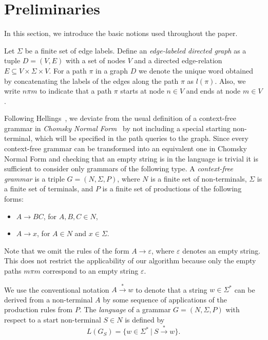 \documentclass[runningheads,a4paper]{llncs}
\begin{document}
\section{Preliminaries} \label{section_preliminaries}%
In this section, we introduce the basic notions used throughout the paper.

Let $\Sigma$ be a finite set of edge labels. Define an \textit{edge-labeled directed graph} as a tuple $D = (V, E)$ with a set of nodes $V$ and a directed edge-relation $E \subseteq V \times \Sigma \times V$.  For a path $\pi$ in a graph $D$ we denote the unique word obtained by concatenating the labels of the edges along the path $\pi$ as $l(\pi)$. Also, we write $n \pi m$ to indicate that a path $\pi$ starts at node $n \in V$ and ends at node $m \in V$.

Following Hellings~\cite{hellingsRelational}, we deviate from the usual definition of a context-free grammar in \textit{Chomsky Normal Form}~\cite{chomsky} by not including a special starting non-terminal, which will be specified in the path queries to the graph. Since every context-free grammar can be transformed into an equivalent one in Chomsky Normal Form and checking that an empty string is in the language is trivial it is sufficient to consider only grammars of the following type. A \textit{context-free grammar} is a triple $G = (N, \Sigma, P)$, where $N$ is a finite set of non-terminals, $\Sigma$ is a finite set of terminals, and $P$ is a finite set of productions of the following forms:

\begin{itemize}
	\item $A \rightarrow B C$, for $A,B,C \in N$,
	\item $A \rightarrow x$, for $A \in N$ and $x \in \Sigma$.   
\end{itemize}

Note that we omit the rules of the form $A \rightarrow \varepsilon$, where $\varepsilon$ denotes an empty string. This does not restrict the applicability of our algorithm because only the empty paths $m \pi m$ correspond to an empty string $\varepsilon$.

We use the conventional notation $A \xrightarrow{*} w$ to denote that a string $w \in \Sigma^*$ can be derived from a non-terminal $A$ by some sequence of applications of the production rules from $P$. The \textit{language} of a grammar $G = (N,\Sigma,P)$ with respect to a start non-terminal $S \in N$ is defined by $$L(G_S) = \{w \in \Sigma^*~|~S \xrightarrow{*} w\}.$$
\end{document}
